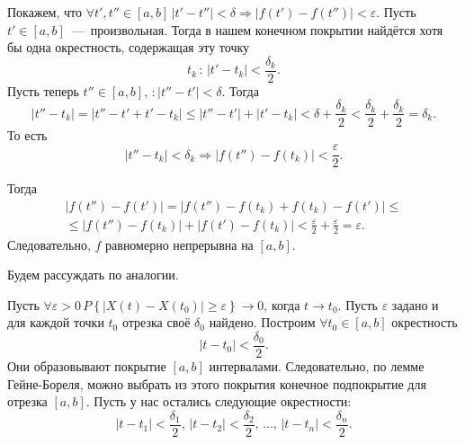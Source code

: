 Покажем, что
$ \forall t', t'' \in \left[ a, b \right] \,
  \left| t' - t'' \right| < \delta \Rightarrow
  \left| f \left( t' \right) - f \left( t'' \right) \right| < \varepsilon $.
Пусть $t' \in \left[ a, b \right] $~---~произвольная.
Тогда в нашем конечном покрытии найдётся хотя бы одна окрестность, содержащая эту точку
\begin{equation*}
  t_k \, : \,
  \left| t' - t_k \right| < \frac{ \delta_k}{2}.
\end{equation*}
Пусть теперь $t'' \in \left[ a, b \right] , \, : \left| t'' - t' \right| < \delta $.
Тогда
\begin{equation*}
  \left| t'' - t_k \right| =
  \left| t'' - t' + t' - t_k \right| \leq
  \left| t'' - t' \right| + \left| t' - t_k \right| <
  \delta + \frac{ \delta_k}{2} <
  \frac{ \delta_k}{2} + \frac{ \delta_k}{2} =
  \delta_k.
\end{equation*}
То есть
\begin{equation*}
  \left| t'' - t_k \right| < \delta_k \Rightarrow
  \left| f \left( t'' \right) - f \left( t_k \right) \right| < \frac{ \varepsilon }{2}.
\end{equation*}

Тогда
\begin{gather*}
  \left| f \left( t'' \right) - f \left( t' \right) \right| =
  \left|
    f \left( t'' \right) - f \left( t_k \right) + f \left( t_k \right) - f \left( t' \right)
  \right| \leq \\
  \leq \left| f \left( t'' \right) - f \left( t_k \right) \right| +
  \left| f \left( t' \right) - f \left( t_k \right) \right| <
  \frac{ \varepsilon }{2} + \frac{ \varepsilon }{2} =
  \varepsilon.
\end{gather*}
Следовательно,  $f$ равномерно непрерывна на $ \left[ a, b \right] $.

Будем рассуждать по аналогии.

Пусть
$ \forall \varepsilon > 0 \,
  P \left\{ \left| X \left( t \right) - X \left( t_0 \right) \right| \geq \varepsilon \right\} \to
  0$,
когда $t \to t_0$.
Пусть $ \varepsilon $ задано и для каждой точки $t_0$ отрезка своё $ \delta_0 $ найдено.
Построим $ \forall t_0 \in \left[ a, b \right] $ окрестность
\begin{equation*}
  \left| t - t_0 \right| <
  \frac{ \delta_0}{2}.
\end{equation*}
Они образовывают покрытие $ \left[ a, b \right] $ интервалами.
Следовательно, по лемме Гейне-Бореля,
можно выбрать из этого покрытия конечное подпокрытие для отрезка $ \left[ a, b \right] $.
Пусть у нас остались следующие окрестности:
\begin{equation*}
  \left| t - t_1 \right| < \frac{ \delta_1}{2}, \,
  \left| t - t_2 \right| < \frac{ \delta_2}{2}, \,
  \dotsc, \,
  \left| t - t_n \right| < \frac{ \delta_n}{2}.
\end{equation*}

